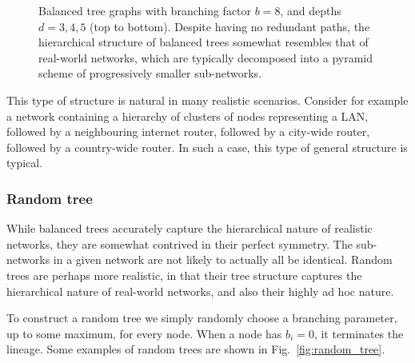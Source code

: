 \documentclass[aps,rmp,twocolumn,amsmath,amssymb,nofootinbib,superscriptaddress,longbibliography,floatfix]{revtex4-1}
\begin{document}
\begin{figure}[!htb]
\caption{Balanced tree graphs with branching factor $b=8$, and depths $d=3,4,5$ (top to bottom). Despite having no redundant paths, the hierarchical structure of balanced trees somewhat resembles that of real-world networks, which are typically decomposed into a pyramid scheme of progressively smaller sub-networks.} \label{fig:tree_example}
\end{figure}

This type of structure is natural in many realistic scenarios. Consider for example a network containing a hierarchy of clusters of nodes representing a LAN, followed by a neighbouring internet router, followed by a city-wide router, followed by a country-wide router. In such a case, this type of general structure is typical.

%
%

\subsubsection{Random tree}

While balanced trees accurately capture the hierarchical nature of realistic networks, they are somewhat contrived in their perfect symmetry. The sub-networks in a given network are not likely to actually all be identical. Random trees are perhaps more realistic, in that their tree structure captures the hierarchical nature of real-world networks, and also their highly ad hoc nature.

To construct a random tree we simply randomly choose a branching parameter, up to some maximum, for every node. When a node has \mbox{$b_i=0$}, it terminates the lineage. Some examples of random trees are shown in Fig.~\ref{fig:random_tree}.
\end{document}
